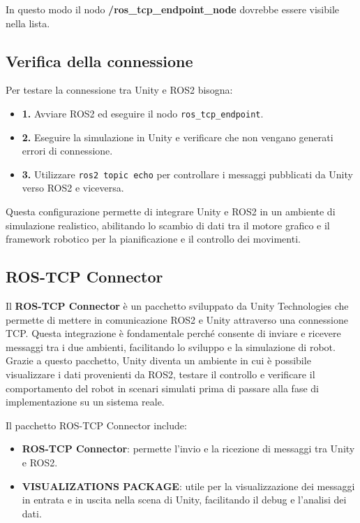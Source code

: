\documentclass[11pt]{report}
\begin{document}
In questo modo il nodo \textbf{/ros\_tcp\_endpoint\_node} dovrebbe essere visibile nella lista.

\subsection*{\textbf{Verifica della connessione}}

Per testare la connessione tra Unity e ROS2 bisogna:

\begin{itemize}
    \item \textbf{1.} Avviare ROS2 ed eseguire il nodo \texttt{ros\_tcp\_endpoint}.
    \item \textbf{2.} Eseguire la simulazione in Unity e verificare che non vengano generati errori di connessione.
    \item \textbf{3.} Utilizzare \texttt{ros2 topic echo} per controllare i messaggi pubblicati da Unity verso ROS2 e viceversa.
\end{itemize}

Questa configurazione permette di integrare Unity e ROS2 in un ambiente di simulazione realistico, abilitando lo scambio di dati tra il motore grafico e il framework robotico per la pianificazione e il controllo dei movimenti.

\subsection*{\textbf{ROS-TCP Connector}}

Il \textbf{ROS-TCP Connector} è un pacchetto sviluppato da Unity Technologies che permette di mettere in comunicazione ROS2 e Unity attraverso una connessione TCP. Questa integrazione è fondamentale perché consente di inviare e ricevere messaggi tra i due ambienti, facilitando lo sviluppo e la simulazione di robot. Grazie a questo pacchetto, Unity diventa un ambiente in cui è possibile visualizzare i dati provenienti da ROS2, testare il controllo e verificare il comportamento del robot in scenari simulati prima di passare alla fase di implementazione su un sistema reale.

Il pacchetto ROS-TCP Connector include:

\begin{itemize}
    \item \textbf{ROS-TCP Connector}: permette l’invio e la ricezione di messaggi tra Unity e ROS2.
    \item \textbf{VISUALIZATIONS PACKAGE}: utile per la visualizzazione dei messaggi in entrata e in uscita nella scena di Unity, facilitando il debug e l'analisi dei dati.
\end{itemize}
\end{document}

